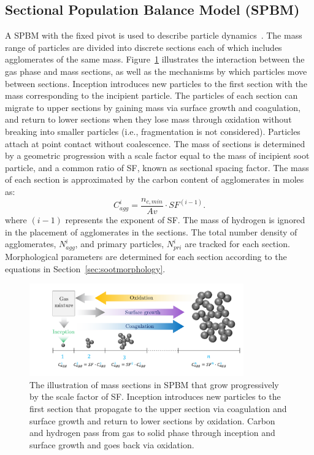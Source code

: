 \subsection{Sectional Population Balance Model (SPBM)}
A SPBM with the fixed pivot is used to describe particle dynamics~\citep{wu1988discrete}. The mass range of particles are divided into discrete sections each of which includes agglomerates of the same mass. Figure~\ref{fig:sectional} illustrates the interaction between the gas phase and mass sections, as well as the mechanisms by which particles move between sections. Inception introduces new particles to the first section with the mass corresponding to the incipient particle. The particles of each section can migrate to upper sections by gaining mass via surface growth and coagulation, and return to lower sections when they lose mass through oxidation without breaking into smaller particles (i.e., fragmentation is not considered). Particles attach at point contact without coalescence. The mass of sections is determined by a geometric progression with a scale factor equal to the mass of incipient soot particle, and a common ratio of SF, known as sectional spacing factor. The mass of each section is approximated by the carbon content of agglomerates in moles as:
\begin{equation}
	C^i_{agg} = \frac{n_{c,min}}{Av}\cdot SF^{(i-1)}
	\label{eqn:Caggsec}.
\end{equation}
\noindent where $(i-1)$ represents the exponent of SF. The mass of hydrogen is ignored in the placement of agglomerates in the sections.
The total number density of agglomerates, ${N^i_{agg}}$, and primary particles, ${N^i_{pri}}$ are tracked for each section. Morphological parameters are determined for each section according to the equations in Section~\ref{sec:sootmorphology}.

\begin{figure}[!htbp]
	\centering
	\includegraphics[height=40mm, ]{Figures/Theory/Sectional.pdf}
	\caption{The illustration of mass sections in SPBM that grow progressively by the scale factor of SF. Inception introduces new particles to the first section that propagate to the upper section via coagulation and surface growth and return to lower sections by oxidation. Carbon and hydrogen pass from gas to solid phase through inception and surface growth and goes back via oxidation.}
	\label{fig:sectional}
\end{figure}
 
